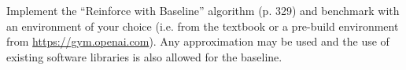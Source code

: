 
\begin{exercise}

Implement the \enquote{Reinforce with Baseline} algorithm (p. 329) and benchmark with an environment of your choice (i.e. from the textbook or a pre-build environment from \href{https://gym.openai.com}{https://gym.openai.com}).
Any approximation may be used and the use of existing software libraries is also allowed for the baseline.

\end{exercise}


\begin{solution}

\phantom{}

\end{solution}

